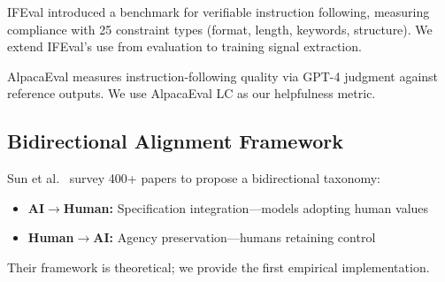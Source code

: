 IFEval \citep{zhou2023ifeval} introduced a benchmark for verifiable instruction following, measuring compliance with 25 constraint types (format, length, keywords, structure). We extend IFEval's use from evaluation to training signal extraction.

AlpacaEval \citep{dubois2024alpacaeval} measures instruction-following quality via GPT-4 judgment against reference outputs. We use AlpacaEval LC as our helpfulness metric.

\subsection{Bidirectional Alignment Framework}

Sun et al.\ \citep{sun2024bidirectional} survey 400+ papers to propose a bidirectional taxonomy:
\begin{itemize}
    \item \textbf{AI$\rightarrow$Human:} Specification integration---models adopting human values
    \item \textbf{Human$\rightarrow$AI:} Agency preservation---humans retaining control
\end{itemize}
Their framework is theoretical; we provide the first empirical implementation.
